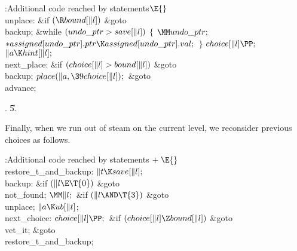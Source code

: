 \B{}:Additional code reached by  statements\X${}\E{}$\6
\4\\{unplace}:\6
\&{if} ${}(\R\\{bound}[\|l]){}$\1\5
\&{goto} \\{backup};\2\6
\&{while} ${}(\\{undo\_ptr}>\\{save}[\|l]){}$\5
${}\{{}$\1\6
${}\MM\\{undo\_ptr};{}$\6
${}{*}\\{assigned}[\\{undo\_ptr}].\\{ptr}\K\\{assigned}[\\{undo\_ptr}].%
\\{val};{}$\6
\4${}\}{}$\2\6
${}\\{choice}[\|l]\PP;{}$\6
${}\|a\K\\{hint}[\|l];{}$\6
\4\\{next\_place}:\5
\&{if} ${}(\\{choice}[\|l]>\\{bound}[\|l]){}$\1\5
\&{goto} \\{backup};\2\6
${}\\{place}(\|a,\39\\{choice}[\|l]);{}$\6
\&{goto} \\{advance};\par
{}.
\U5.\fi

Finally, when we run out of steam on the current level, we reconsider
previous choices as follows.

\fi

\B{}:Additional code reached by  statements\X${}\mathrel+%
\E{}$\6
\4\\{restore\_t\_and\_backup}:\5
${}\|t\K\\{save}[\|l];{}$\6
\4\\{backup}:\6
\&{if} ${}(\|l\E\T{0}){}$\1\5
\&{goto} \\{not\_found};\2\6
${}\MM\|l;{}$\6
\&{if} ${}(\|l\AND\T{3}){}$\1\5
\&{goto} \\{unplace};\2\6
${}\|a\K\\{ub}[\|t]{}$;\6
\4\\{next\_choice}:\5
${}\\{choice}[\|l]\PP;{}$\6
\&{if} ${}(\\{choice}[\|l]\Z\\{bound}[\|l]){}$\1\5
\&{goto} \\{vet\_it};\2\6
\&{goto} \\{restore\_t\_and\_backup};\par
\fi

